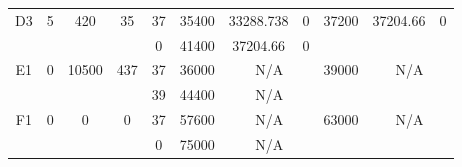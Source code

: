 \begin{sidewaystable}
\begin{tabular}{c||c|c|c||c|c|c|c||c|c|c}
         &
        
      \\
      \hline
      \multirow{2}{*}{D3} &
      \multirow{2}{*}{5} &
      \multirow{2}{*}{420} &
      \multirow{2}{*}{35} &
      37 &
      35400 &
        33288.738 &
        0 &
      \multirow{2}{*}{37200} &
        \multirow{2}{*}{37204.66} &
        \multirow{2}{*}{0}
      \\
      \cline{5-8}
       &
       &
       &
       &
      0 &
      41400 &
        37204.66 &
        0 &
      
         &
        
      \\
      \hline
      \multirow{2}{*}{E1} &
      \multirow{2}{*}{0} &
      \multirow{2}{*}{10500} &
      \multirow{2}{*}{437} &
      37 &
      36000 &
        \multicolumn{2}{|c||}{N/A} &
      \multirow{2}{*}{39000} &
        \multicolumn{2}{c}{\multirow{2}{*}{N/A}}
      \\
      \cline{5-8}
       &
       &
       &
       &
      39 &
      44400 &
        \multicolumn{2}{|c||}{N/A} &
      
        
      \\
      \hline
      \multirow{2}{*}{F1} &
      \multirow{2}{*}{0} &
      \multirow{2}{*}{0} &
      \multirow{2}{*}{0} &
      37 &
      57600 &
        \multicolumn{2}{|c||}{N/A} &
      \multirow{2}{*}{63000} &
        \multicolumn{2}{c}{\multirow{2}{*}{N/A}}
      \\
      \cline{5-8}
       &
       &
       &
       &
      0 &
      75000 &
        \multicolumn{2}{|c||}{N/A} &
      
        
      \\
\end{tabular}
\label{table:RASDATASET1} 
\end{sidewaystable}